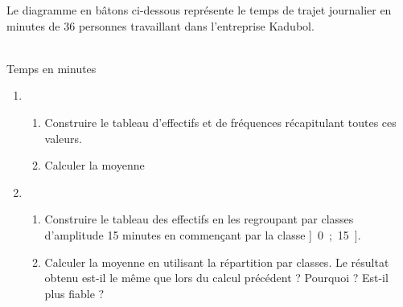 \exercicesbase

\begin{colonne*exercice}

\begin{exercice} %
   Le diagramme en bâtons ci-dessous représente le temps de trajet journalier en minutes de 36 personnes travaillant dans l'entreprise Kadubol.
   \begin{center}
      {\footnotesize  
    \\ [-2mm]
   \hspace*{50mm} Temps en minutes}
   \end{center}  
   \vspace*{-5mm}
   \begin{enumerate}
      \item
      \begin{enumerate}
         \item Construire le tableau d'effectifs et de fréquences récapitulant toutes ces valeurs.
         \item Calculer la moyenne
      \end{enumerate}
      \item
      \begin{enumerate}
         \item Construire le tableau des effectifs en les regroupant par classes d'amplitude 15 minutes en commençant par la classe ]~0~;~15~].
         \item Calculer la moyenne en utilisant la répartition par classes. Le résultat obtenu est-il le même que lors du calcul précédent ? Pourquoi ? Est-il plus fiable ?
      \end{enumerate}
   \end{enumerate}
\end{exercice}


\end{colonne*exercice}
